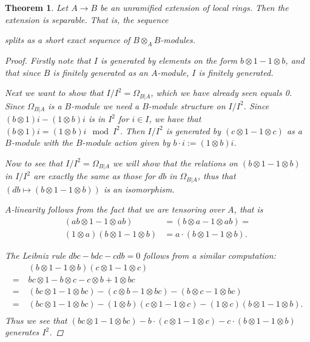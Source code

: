 \documentclass[11pt, a4paper, english]{article}
\newtheorem{theorem}{Theorem}[section]
\theoremstyle{definition}
\begin{document}
\begin{theorem}
\label{thm:unramified_implies_separable}
Let $A \to B$ be an unramified extension of local rings. Then the extension is separable. That is, the sequence
\begin{center}
\end{center}
splits as a short exact sequence of $B\otimes_AB$-modules.

\begin{proof}
Firstly note that $I$ is generated by elements on the form $b \otimes 1 - 1 \otimes b$, and that since $B$ is finitely generated as an $A$-module, $I$ is finitely generated.

Next we want to show that $I/I^2 = \Omega_{B|A}$, which we have already seen equals 0. Since $\Omega_{B|A}$ is a $B$-module we need a $B$-module structure on $I/I^2$. Since $(b \otimes 1)i - (1\otimes b)i$ is in $I^2$ for $i \in I$, we have that $(b \otimes 1)i = (1 \otimes b)i \mod I^2$. Then $I/I^2$ is generated by $(c \otimes 1 - 1 \otimes c)$ as a $B$-module with the $B$-module action given by $b \cdot i := (1 \otimes b)i$.

Now to see that $I/I^2 = \Omega_{B|A}$ we will show that the relations on $(b \otimes 1 - 1 \otimes b)$ in $I/I^2$ are exactly the same as those for $db$ in $\Omega_{B|A}$, thus that $(db \mapsto (b \otimes 1 - 1 \otimes b))$ is an isomorphism.

$A$-linearity follows from the fact that we are tensoring over $A$, that is
\begin{align*}
(ab \otimes 1 - 1 \otimes ab) &= (b \otimes a - 1 \otimes ab) =\\
(1 \otimes a)(b \otimes 1 - 1 \otimes b) &= a \cdot
(b \otimes 1 - 1 \otimes b).
\end{align*}

The Leibniz rule $dbc - bdc - cdb = 0$ follows from a similar computation:
\begin{align*}
& \;(b \otimes 1 - 1 \otimes b)(c \otimes 1 - 1 \otimes c) \\
=&\; bc \otimes 1 - b \otimes c - c \otimes b + 1 \otimes bc \\
=&\; (bc \otimes 1 - 1 \otimes bc) - (c \otimes b - 1 \otimes bc) - (b \otimes c - 1 \otimes bc)\\
=&\; (bc \otimes 1 - 1 \otimes bc) - (1 \otimes b)(c \otimes 1 - 1 \otimes c) - (1 \otimes c)(b \otimes 1 - 1 \otimes b).\\
\end{align*}
Thus we see that $(bc \otimes 1 - 1 \otimes bc) - b \cdot (c \otimes 1 - 1 \otimes c) - c \cdot (b \otimes 1 - 1 \otimes b)$ generates $I^2$.


\end{proof}
\end{theorem}
\end{document}
